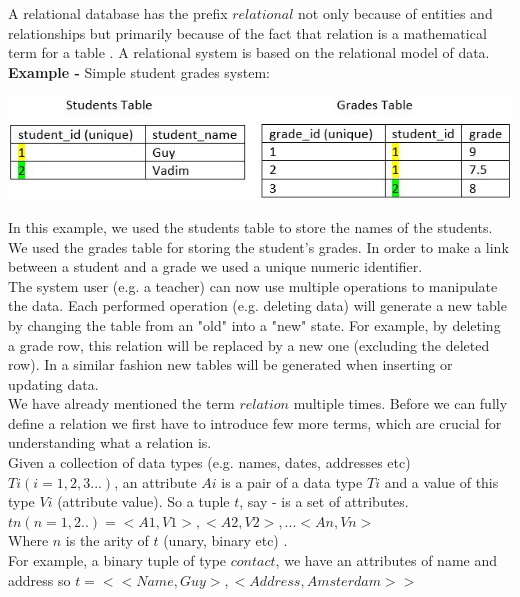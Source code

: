 \documentclass[oneside]{book}
\begin{document}
A relational database has the prefix $relational$ not only because of entities and relationships but primarily because of the fact that relation is a mathematical term 
for a table \cite[p.~26]{introtodb}. A relational system is based on the relational model of data.\\

\textbf{Example -} Simple student grades system:

\begin{center}
\includegraphics[scale=0.9]{table1}
\end{center}

In this example, we used the students table to store the names of the students. We used the grades table for storing the student’s grades. In order to make a link between a student and a grade we used a unique numeric identifier. \\

The system user (e.g. a teacher) can now use multiple operations to manipulate the data. Each performed operation (e.g. deleting data) will generate a new table by changing the table from an "old" into a "new" state. For example, by deleting a grade row, this relation will be replaced by a new one (excluding the deleted row). In a similar fashion new tables will be generated when inserting or updating data. \\

We have already mentioned the term $relation$ multiple times. Before we can fully define a relation we first have to introduce few more terms, which are crucial for understanding what a relation is.\\

Given a collection of data types (e.g. names, dates, addresses etc) $Ti(i=1,2,3...)$, an attribute $Ai$ is a pair of a data type $Ti$ and a value of this type $Vi$ (attribute value). So a tuple $t$, say - is a set of attributes.\\
$tn(n=1,2..)={<A1, V1>, <A2, V2>, ... <An, Vn>}$\\
Where $n$ is the arity of $t$ (unary, binary etc) \cite[p.~142]{introtodb}.\\
For example, a binary tuple of type $contact$, we have an attributes of name and address so $t = <<Name, Guy>, <Address, Amsterdam>>$
\end{document}
